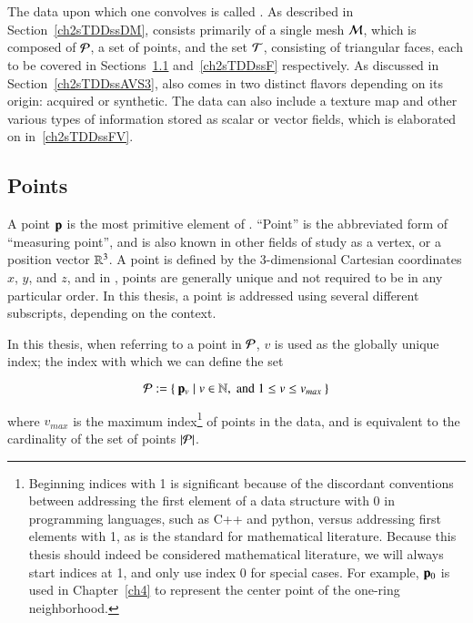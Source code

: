 \section{\tdd}
\label{ch2sTDD}
The data upon which one convolves  is called \tdd{}. As described in Section~\ref{ch2sTDDssDM}, \tdd{} consists primarily of a single mesh $\mathcal{M}$, which is composed of $\mathcal{P}$, a set of points, and the set $\mathcal{T}$, consisting of triangular faces, each to be covered in Sections~\ref{ch2sTDDssP} and~\ref{ch2sTDDssF} respectively. As discussed in Section~\ref{ch2sTDDssAVS3}, \tdd{} also comes in two distinct flavors depending on its origin: acquired or synthetic. The data can also include a texture map and other various types of information stored as scalar or vector fields, which is elaborated on in~\ref{ch2sTDDssFV}.

%
%
%
%
\subsection{Points}
\label{ch2sTDDssP}
A point $\mathbf{p}$ is the most primitive element of \tdd{}. ``Point'' is the abbreviated form of ``measuring point'', and is also known in other fields of study as a vertex, or a position vector $\mathbb{R}^{3}$. A point is defined by the 3-dimensional Cartesian coordinates $x$, $y$, and $z$, and in \tdd{}, points are generally unique and not required to be in any particular order. In this thesis, a point is addressed using several different subscripts, depending on the context.

In this thesis, when referring to a point in $\mathcal{P}$, $v$ is used as the globally unique index; the index with which we can define the set

\begin{equation}
	\mathcal{P} := \left \{\:\mathbf{p}_v \mid v \in \mathbb{N}, \;\text{and}\; 1\leq v \leq v_{max}\:\right \}
	\label{eq:defineSetOfPoints}
\end{equation}

where $v_{max}$ is the maximum index\footnote{\label{indicesFootnote}Beginning indices with 1 is significant because of the discordant conventions between addressing the first element of a data structure with 0 in programming languages, such as C++ and python, versus addressing first elements with 1, as is the standard for mathematical literature. Because this thesis should indeed be considered mathematical literature, we will always start indices at 1, and only use index 0 for special cases. For example, $\mathbf{p}_0$ is used in Chapter~\ref{ch4} to represent the center point of the one-ring neighborhood.} of points in the data, and is equivalent to the cardinality of the set of points $|\mathcal{P}|$.%
%
%

